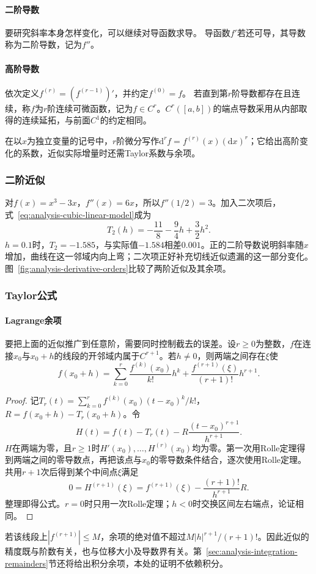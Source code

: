 \paragraph{二阶导数}
要研究斜率本身怎样变化，可以继续对导函数求导。
导函数$f'$若还可导，其导数称为二阶导数，记为$f''$。

\paragraph{高阶导数}
依次定义$f^{(r)}=(f^{(r-1)})'$，并约定$f^{(0)}=f$。
若直到第$r$阶导数都存在且连续，称$f$为$r$阶连续可微函数，记为$f\in C^r$。$C^r([a,b])$的端点导数采用从内部取得的连续延拓，与前面$C^1$的约定相同。

在以$x$为独立变量的记号中，$r$阶微分写作$\mathrm d^rf=f^{(r)}(x)(\mathrm dx)^r$；它给出高阶变化的系数，近似实际增量时还需Taylor系数与余项。

\subsubsection{二阶近似}
\label{sec:analysis-second-order-curvature}
对$f(x)=x^3-3x$，$f''(x)=6x$，所以$f''(1/2)=3$。加入二次项后，式~\eqref{eq:analysis-cubic-linear-model}成为
\begin{equation}
 T_2(h)=-\frac{11}{8}-\frac94h+\frac32h^2.
\label{eq:analysis-cubic-quadratic-model}
\end{equation}
$h=0.1$时，$T_2=-1.585$，与实际值$-1.584$相差$0.001$。正的二阶导数说明斜率随$x$增加，曲线在这一邻域内向上弯；二次项正好补充切线近似遗漏的这一部分变化。图~\ref{fig:analysis-derivative-orders}比较了两阶近似及其余项。

\subsubsection{Taylor公式}
\label{sec:analysis-taylor-approximation}

\paragraph{Lagrange余项}
要把上面的近似推广到任意阶，需要同时控制截去的误差。设$r\geq0$为整数，$f$在连接$x_0$与$x_0+h$的线段的开邻域内属于$C^{r+1}$。若$h\neq0$，则两端之间存在$\xi$使
\begin{equation}
 f(x_0+h)=\sum_{k=0}^r\frac{f^{(k)}(x_0)}{k!}h^k
 +\frac{f^{(r+1)}(\xi)}{(r+1)!}h^{r+1}.
\label{eq:analysis-taylor-arbitrary-order}
\end{equation}
\begin{proof}
记$T_r(t)=\sum_{k=0}^rf^{(k)}(x_0)(t-x_0)^k/k!$，$R=f(x_0+h)-T_r(x_0+h)$。令
\[
 H(t)=f(t)-T_r(t)-R\frac{(t-x_0)^{r+1}}{h^{r+1}}.
\]
$H$在两端为零，且$r\geq1$时$H'(x_0),\ldots,H^{(r)}(x_0)$均为零。第一次用Rolle定理得到两端之间的零导数点，再把该点与$x_0$的零导数条件结合，逐次使用Rolle定理。共用$r+1$次后得到某个中间点$\xi$满足
\[
 0=H^{(r+1)}(\xi)=f^{(r+1)}(\xi)-\frac{(r+1)!}{h^{r+1}}R.
\]
整理即得公式。$r=0$时只用一次Rolle定理；$h<0$时交换区间左右端点，论证相同。
\end{proof}
若该线段上$|f^{(r+1)}|\leq M$，余项的绝对值不超过$M|h|^{r+1}/(r+1)!$。因此近似的精度既与阶数有关，也与位移大小及导数界有关。第~\ref{sec:analysis-integration-remainders}节还将给出积分余项，本处的证明不依赖积分。

